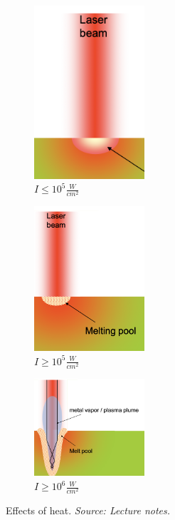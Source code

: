 \begin{figure}[h!]
    \centering
    \begin{subfigure}{0.25\textwidth}
        \includegraphics[width=0.45\textwidth]{slike/hef1.png}
        \caption{$I \le 10^5 \frac{W}{cm^2} $}
        \label{fig:hef1}
    \end{subfigure}

    \begin{subfigure}{0.25\textwidth}
        \includegraphics[width=0.45\textwidth]{slike/hef2.png}
        \caption{$I \ge 10^5 \frac{W}{cm^2}$}
        \label{fig:hef2}
    \end{subfigure}

    \begin{subfigure}{0.25\textwidth}
        \includegraphics[width=0.45\textwidth]{slike/hef3.png}
        \caption{$I \ge 10^6 \frac{W}{cm^2}$}
        \label{fig:hef3}    
    \end{subfigure}

    \caption{Effects of heat. \textit{Source: Lecture notes.}}
    \label{fig:hef}
\end{figure}


